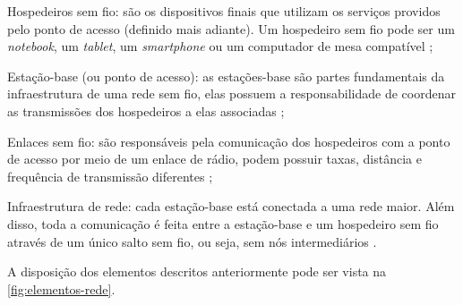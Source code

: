 \begin{compactitem}
	\item Hospedeiros sem fio: são os dispositivos finais que utilizam os serviços providos pelo ponto de acesso (definido mais adiante). Um hospedeiro sem fio pode ser um \textit{notebook}, um \textit{tablet}, um \textit{smartphone} ou um computador de mesa compatível \cite{kurose2013};
	\item Estação-base (ou ponto de acesso): as estações-base são partes fundamentais da infraestrutura de uma rede sem fio, elas possuem a responsabilidade de coordenar as transmissões dos hospedeiros a elas associadas \cite{kurose2013};
	\item Enlaces sem fio: são responsáveis pela comunicação dos hospedeiros com a ponto de acesso por meio de um enlace de rádio, podem possuir taxas, distância e frequência de transmissão diferentes \cite{kurose2013};
	\item Infraestrutura de rede: cada estação-base está conectada a uma rede maior. Além disso, toda a comunicação é feita entre a estação-base e um hospedeiro sem fio através de um único salto sem fio, ou seja, sem nós intermediários \cite{kurose2013}.
\end{compactitem}

A disposição dos elementos descritos anteriormente pode ser vista na \autoref{fig:elementos-rede}.

\begin{figure}[H]
	\centering
\end{figure}


